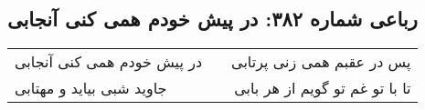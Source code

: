 \begin{center}
\section*{رباعی شماره ۳۸۲: در پیش خودم همی کنی آنجابی}
\label{sec:sh382}
\begin{longtable}{l p{0.5cm} r}
در پیش خودم همی کنی آنجابی
&&
پس در عقبم همی زنی پرتابی
\\
جاوید شبی بیاید و مهتابی
&&
تا با تو غم تو گویم از هر بابی
\\
\end{longtable}
\end{center}
